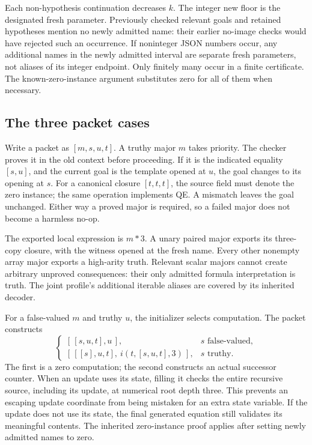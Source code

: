 Each non-hypothesis continuation decreases $k$. The integer new floor is
the designated fresh parameter. Previously checked relevant goals and
retained hypotheses mention no newly admitted name: their earlier
no-image checks would have rejected such an occurrence. If noninteger
JSON numbers occur, any additional names in the newly admitted interval
are separate fresh parameters, not aliases of its integer endpoint.
Only finitely many occur in a finite certificate. The known-zero-instance
argument substitutes zero for all of them when necessary.

\subsection{The three packet cases}

Write a packet as $[m,s,u,t]$. A truthy major $m$ takes priority. The
checker proves it in the old context before proceeding. If it is the
indicated equality $[s,u]$, and the current goal is the template opened
at $u$, the goal changes to its opening at $s$. For a canonical closure
$[t,t,t]$, the source field must denote the zero instance; the same
operation implements QE. A mismatch leaves the goal unchanged. Either
way a proved major is required, so a failed major does not become a
harmless no-op.

The exported local expression is $m*3$. A unary paired major exports
its three-copy closure, with the witness opened at the fresh name.
Every other nonempty array major exports a high-arity truth. Relevant
scalar majors cannot create arbitrary unproved consequences: their
only admitted formula interpretation is truth. The joint profile's
additional iterable aliases are covered by its inherited decoder.

For a false-valued $m$ and truthy $u$, the initializer selects
computation. The packet constructs
\[
 \begin{cases}
 [\,[s,u,t],u\,], &s\text{ false-valued},\\
 [\,[[s],u,t],\ i(t,[s,u,t],3)\,], &s\text{ truthy}.
 \end{cases}
\]
The first is a zero computation; the second constructs an actual
successor counter. When an update uses its state, filling it checks the
entire recursive source, including its update, at numerical root depth
three. This prevents an escaping update coordinate from being mistaken
for an extra state variable. If the update does not use its state,
the final generated equation still validates its meaningful contents.
The inherited zero-instance proof applies after setting newly admitted
names to zero.

